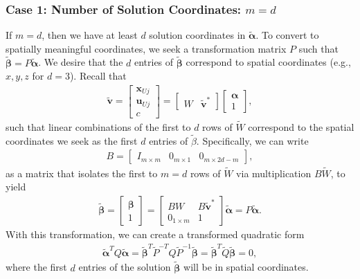 \documentclass[%
preprint,
 amsmath,amssymb,
 aps,
]{revtex4-1}
\begin{document}
\subsubsection{Case 1: Number of Solution Coordinates: $m = d$} 
If $m = d$, then we have at least $d$ solution coordinates in $\bm{\tilde{\alpha}}$. To convert to spatially meaningful coordinates, we seek a transformation matrix $P$ such that $\tilde{\bm{\beta}} = P \tilde{\bm{\alpha}}$. We desire that the $d$ entries of $\bm{\tilde{\beta}}$ correspond to spatial coordinates (e.g., $x, y, z$ for $d = 3$). Recall that
\begin{align*}
\bm{\tilde{v}} 
=
\begin{bmatrix}
\bm{x}_{Uj}\\
\bm{u}_{Uj}\\
c
\end{bmatrix}
= 
\begin{bmatrix}
W & \bm{\tilde{v}}^*
\end{bmatrix}
\begin{bmatrix}
\bm{\alpha}\\
1
\end{bmatrix},
\end{align*}
such that linear combinations of the first to $d$ rows of $\tilde{W}$ correspond to the spatial coordinates we seek as the first $d$ entries of $\tilde{\beta}$. Specifically, we can write
\begin{align*}
B = 
\begin{bmatrix}
I_{m \times m} & 0_{m \times 1} & 0_{m \times 2d-m}
\end{bmatrix},
\end{align*}
as a matrix that isolates the first to $m=d$ rows of $\tilde{W}$ via multiplication $B\tilde{W}$, to yield
\begin{align*}
\bm{\tilde{\beta}} = 
\begin{bmatrix}
\bm{\beta}\\
1
\end{bmatrix}
= 
\begin{bmatrix}
BW & B\bm{\tilde{v}}^*\\
0_{1 \times m} & 1
\end{bmatrix}
\bm{\tilde{\alpha}}
=
P \bm{\tilde{\alpha}}.
\end{align*}
With this transformation, we can create a transformed quadratic form
\begin{align*}
\bm{\tilde{\alpha}}^T Q \bm{\tilde{\alpha}} = \bm{\tilde{\beta}}^T \tilde{P}^{-T} Q \tilde{P}^{-1} \bm{\tilde{\beta}} = \bm{\tilde{\beta}}^T \tilde{Q}\bm{\tilde{\beta}} = 0,
\end{align*}
where the first $d$ entries of the solution $\bm{\tilde{\beta}}$ will be in spatial coordinates. 
\end{document}
